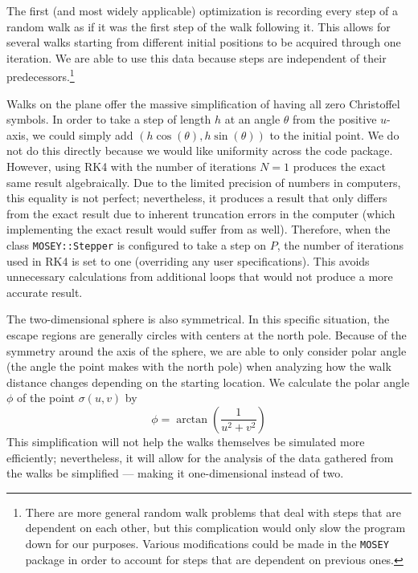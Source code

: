 \documentclass[12pt]{article}
\newcommand{\MOSEY}{\texttt{MOSEY}}
\begin{document}
		The first (and most widely applicable) optimization is recording every step of a random walk as if it was the first step of the walk following it. %
		This allows for several walks starting from different initial positions to be acquired through one iteration.
		We are able to use this data because steps are independent of their predecessors.\footnote{There are more general random walk problems that deal with steps that are dependent on each other, but this complication would only slow the program down for our purposes. Various modifications could be made in the \MOSEY{} package in order to account for steps that are dependent on previous ones.}
		
		Walks on the plane offer the massive simplification of having all zero Christoffel symbols.
		In order to take a step of length $h$ at an angle $\theta$ from the positive $u$-axis, we could simply add $(h\cos(\theta), h\sin(\theta))$ to the initial point.
		We do not do this directly because we would like uniformity across the code package.
		However, using RK4 with the number of iterations $N = 1$ produces the exact same result algebraically.
		Due to the limited precision of numbers in computers, this equality is not perfect; nevertheless, it produces a result that only differs from the exact result due to inherent truncation errors in the computer (which implementing the exact result would suffer from as well).
		Therefore, when the class \texttt{MOSEY::Stepper} is configured to take a step on $P$, the number of iterations used in RK4 is set to one (overriding any user specifications).
		This avoids unnecessary calculations from additional loops that would not produce a more accurate result.
		
		The two-dimensional sphere is also symmetrical.
		In this specific situation, the escape regions are generally circles with centers at the north pole.
		Because of the symmetry around the axis of the sphere, we are able to only consider polar angle (the angle the point makes with the north pole) when analyzing how the walk distance changes depending on the starting location.
		We calculate the polar angle $\phi$ of the point $\sigma(u,v)$ by
		\begin{equation*}
			\phi = \arctan\left(\frac{1}{u^2+v^2}\right)
		\end{equation*}
		This simplification will not help the walks themselves be simulated more efficiently; nevertheless, it will allow for the analysis of the data gathered from the walks be simplified --- making it one-dimensional instead of two.
		
\end{document}
